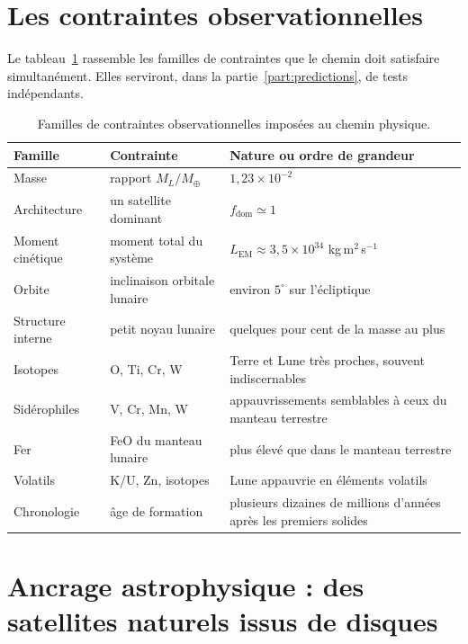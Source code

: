 \documentclass[11pt,a4paper,openany]{report}
\newcommand{\Mt}{M_{\oplus}}
\begin{document}
\section{Les contraintes observationnelles}

Le tableau~\ref{tab:contraintes} rassemble les familles de contraintes que le chemin doit
satisfaire simultanément. Elles serviront, dans la partie~\ref{part:predictions}, de tests
indépendants.

\begin{table}[htbp]
\centering
\small
\caption{Familles de contraintes observationnelles imposées au chemin physique.}
\label{tab:contraintes}
\begin{tabularx}{\textwidth}{>{\raggedright\arraybackslash}p{2.6cm}
>{\raggedright\arraybackslash}X >{\raggedright\arraybackslash}p{5.4cm}}
\toprule
\textbf{Famille} & \textbf{Contrainte} & \textbf{Nature ou ordre de grandeur} \\
\midrule
Masse & rapport $M_L/\Mt$ & $1{,}23\times10^{-2}$ \\
Architecture & un satellite dominant & $f_{\mathrm{dom}}\simeq1$ \\
Moment cinétique & moment total du système & $L_{\mathrm{EM}}\approx3{,}5\times10^{34}$ kg\,m$^2$\,s$^{-1}$ \\
Orbite & inclinaison orbitale lunaire & environ $5^\circ$ sur l'écliptique \\
Structure interne & petit noyau lunaire & quelques pour cent de la masse au plus \\
Isotopes & O, Ti, Cr, W & Terre et Lune très proches, souvent indiscernables \\
Sidérophiles & V, Cr, Mn, W & appauvrissements semblables à ceux du manteau terrestre \\
Fer & FeO du manteau lunaire & plus élevé que dans le manteau terrestre \\
Volatils & K/U, Zn, isotopes & Lune appauvrie en éléments volatils \\
Chronologie & âge de formation & plusieurs dizaines de millions d'années après les premiers solides \\
\bottomrule
\end{tabularx}
\end{table}


\section{Ancrage astrophysique : des satellites naturels issus de disques}
\end{document}

